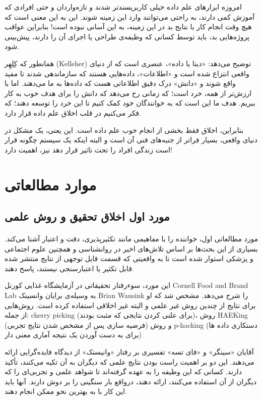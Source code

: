 \documentclass[12pt,oneside]{book}
\begin{document}
    امروزه ابزارهای علم داده خیلی کاربرپسندتر شدند و تازه‌واردان و حتی افرادی که آموزش کمی دارند، به راحتی می‌توانند وارد این زمینه شوند.
    این به این معنی است که هیچ وقت انجام کار با نتایج بد در این زمینه، به این آسانی نبوده است!
    بنابراین عواقب پروژه‌هایی بد، باید توسط کسانی که وظیفه‌ی طراحی یا اجرای آن را دارند، پیش‌بینی شود.

    همانطور که کِلِهِر (Kelleher) توضیح می‌دهد: «دیتا یا داده»، عنصری است که از دنیای واقعی انتزاع شده است و «اطلاعات»، داده‌هایی هستند که سازماندهی شدند تا مفید واقع شوند و «دانش» درک دقیق اطلاعاتی هست که داده‌ها به ما می‌دهند.
    اما با ارزش‌تر از همه، خرد است؛ که زمانی رخ می‌دهد که دانش را برای هدف خوب به کار ببریم.
    هدف ما این است که به خوانندگان خود کمک کنیم تا این خرد را توسعه دهند؛ که فکر می‌کنیم در قلب اخلاق علم داده قرار دارد.

    بنابراین، اخلاق فقط بخشی از انجام خوب علم داده است.
    این یعنی، یک مشکل در دنیای واقعی، بسیار فراتر از جنبه‌های فنی آن است و البته اینکه یک سیستم چگونه قرار است زندگی افراد را تحت تاثیر قرار دهد نیز، اهمیت دارد!

    \section{موارد مطالعاتی}

    \subsection{مورد اول اخلاق تحقیق و روش علمی}
    \paragraph{}
    مورد مطالعاتی اول، خواننده را با مفاهیمی مانند تکثیرپذیری، دقت و اعتبار آشنا می‌کند.
    بسیاری از این بحث‌ها بر اساس تلاش‌های اخیر در روانشناسی و همچنین علوم اجتماعی و پزشکی استوار شده است تا به واقعیتی که قسمت قابل توجهی از نتایج منتشر شده قابل تکثیر یا اعتبارسنجی نیستند، پاسخ دهند.

    این مورد، سوءرفتار تحقیقاتی در آزمایشگاه غذایی کورنل Cornell Food and Brand Lab به وسیله‌ی برایان وانسینک Brian Wansink را شرح می‌دهد.
    مشخص شد که او برای نتایج از چندین روش غیر علمی و البته غیر اخلاقی استفاده کرده است.
    روش‌هایی از جمله: cherry picking (برای علنی کردن نتایجی که مثبت بودند)، روش HAEKing (فرضیه سازی پس از مشخص شدن نتایج تجربی) و روش p-hacking (دستکاری داده ها برای به دست آوردن یک نتیجه آماری معنی دار)

    آقایان «سینگر» و «فای تسه» تفسیری بر رفتار «وانیسنک» از دیدگاه فایده‌گرایی ارائه می‌دهند.
    این دو بر اهمیت راست بودن نتایج علمی که دیگران به آن تکیه می‌کنند، تأکید دارند.
    کسانی که این وظیفه را به عهده گرفته‌اند تا شواهد علمی و تجربی‌ای را که دیگران از آن استفاده می‌کنند، ارائه دهند، درواقع بار سنگینی را بر دوش دارند.
    آنها باید این کار با به بهترین نحو ممکن انجام دهند.
\end{document}
